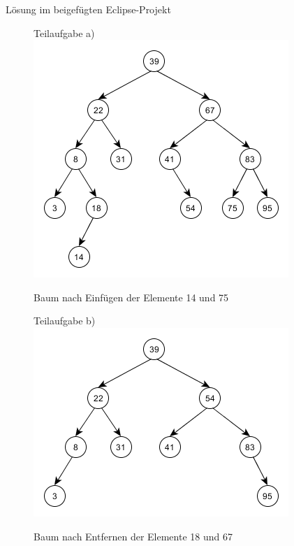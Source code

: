 \documentclass[12pt]{scrartcl}
\begin{document}

\exercise{}
Lösung im beigefügten Eclipse-Projekt

\exercise{}

\begin{figure}[h!]
\begin{center}
Teilaufgabe a)
\includegraphics[scale=0.8]{Aufgabe2a)B2.png}
\caption{Baum nach Einfügen der Elemente 14 und 75}
\end{center}
\end{figure}

\newpage

\begin{figure}[h!]
\begin{center}
Teilaufgabe b)
\includegraphics[scale=0.8]{Aufgabe2b)B3.png}
\caption{Baum nach Entfernen der Elemente 18 und 67}
\end{center}
\end{figure}
\end{document}
